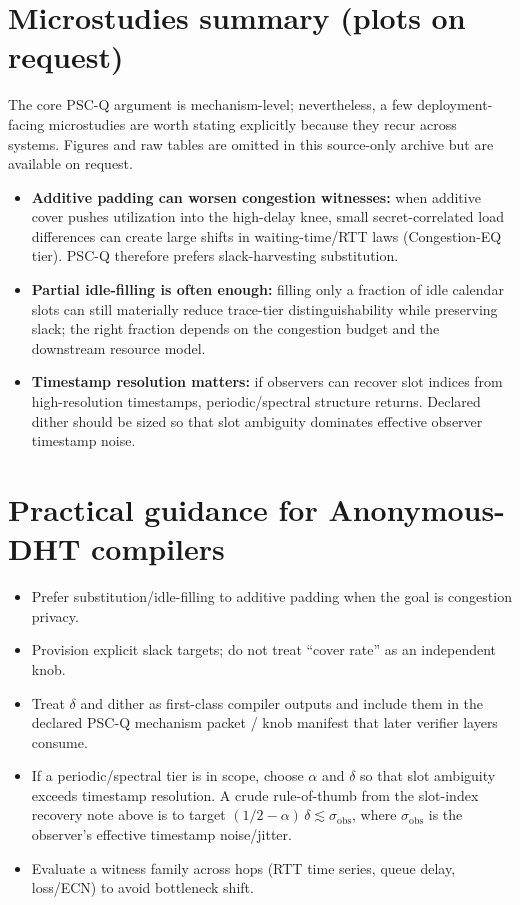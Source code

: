 \documentclass[11pt]{article}
\theoremstyle{definition}
\theoremstyle{remark}
\begin{document}
\section{Microstudies summary (plots on request)}
\label{sec:microstudies-summary}
The core PSC-Q argument is mechanism-level; nevertheless, a few deployment-facing microstudies are worth stating explicitly because they recur across systems.
Figures and raw tables are omitted in this source-only archive but are available on request.
\begin{itemize}[leftmargin=*]
\item \textbf{Additive padding can worsen congestion witnesses:} when additive cover pushes utilization into the high-delay knee, small secret-correlated load differences can create large shifts in waiting-time/RTT laws (Congestion-EQ tier). PSC-Q therefore prefers slack-harvesting substitution.
\item \textbf{Partial idle-filling is often enough:} filling only a fraction of idle calendar slots can still materially reduce trace-tier distinguishability while preserving slack; the right fraction depends on the congestion budget and the downstream resource model.
\item \textbf{Timestamp resolution matters:} if observers can recover slot indices from high-resolution timestamps, periodic/spectral structure returns. Declared dither should be sized so that slot ambiguity dominates effective observer timestamp noise.
\end{itemize}

\section{Practical guidance for Anonymous-DHT compilers}
\begin{itemize}[leftmargin=1.2em]
\item Prefer substitution/idle-filling to additive padding when the goal is congestion privacy.
\item Provision explicit slack targets; do not treat ``cover rate'' as an independent knob.
\item Treat $\delta$ and dither as first-class compiler outputs and include them in the declared PSC-Q mechanism packet / knob manifest that later verifier layers consume.
\item If a periodic/spectral tier is in scope, choose \(\alpha\) and \(\delta\) so that slot ambiguity exceeds timestamp resolution.
  A crude rule-of-thumb from the slot-index recovery note above is to target \((1/2-\alpha)\,\delta \lesssim \sigma_{\mathrm{obs}}\), where \(\sigma_{\mathrm{obs}}\) is the observer's effective timestamp noise/jitter.
\item Evaluate a witness family across hops (RTT time series, queue delay, loss/ECN) to avoid bottleneck shift.
\end{itemize}
\end{document}
